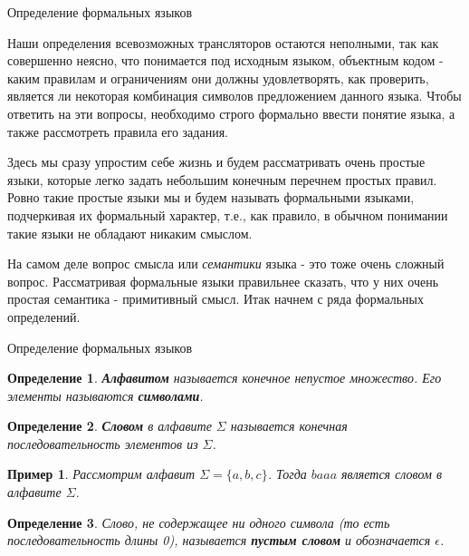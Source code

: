 \documentclass[12pt, pdf, hyperref={unicode},handout]{beamer}
\newtheorem{dfn}{Определение}
\newtheorem{exmpl}{Пример}
\begin{document}
\begin{frame}{Определение формальных языков}
  \begin{block}

    \small{
      Наши определения всевозможных трансляторов остаются неполными, так как совершенно неясно, что понимается под исходным языком, объектным кодом - каким правилам и ограничениям они должны удовлетворять, как проверить, является ли некоторая комбинация символов  предложением данного языка. Чтобы ответить на эти вопросы, необходимо строго формально ввести понятие языка, а также рассмотреть правила его задания.

      Здесь мы сразу упростим себе жизнь и будем рассматривать очень простые языки, которые легко задать небольшим конечным перечнем простых правил. Ровно такие простые языки мы и будем называть формальными языками, подчеркивая их формальный характер, т.е., как правило, в обычном понимании такие языки не обладают никаким смыслом.

      На самом деле вопрос смысла или \textit{семантики} языка - это тоже очень сложный вопрос. Рассматривая формальные языки правильнее сказать, что у них очень простая семантика - примитивный смысл. Итак начнем с ряда формальных определений.
      }

  \end{block}
  
\end{frame}

\begin{frame}{Определение формальных языков}
  \begin{block}

    \small{
      \begin{dfn}
        \textbf{Алфавитом} называется конечное непустое множество. Его элементы называются \textbf{символами}.
      \end{dfn}
      \begin{dfn}
        \textbf{Словом} в алфавите $\Sigma$ называется конечная последовательность элементов из $\Sigma$.
      \end{dfn}
      \begin{exmpl}
        Рассмотрим алфавит $\Sigma=\{a,b,c\}$. Тогда $baaa$ является словом в алфавите $\Sigma$.
      \end{exmpl}
      \begin{dfn}
        Слово, не содержащее ни одного символа (то есть последовательность длины 0), называется \textbf{пустым словом} и обозначается $\epsilon$.
      \end{dfn}
      }

  \end{block}
  
\end{frame}
\end{document}
